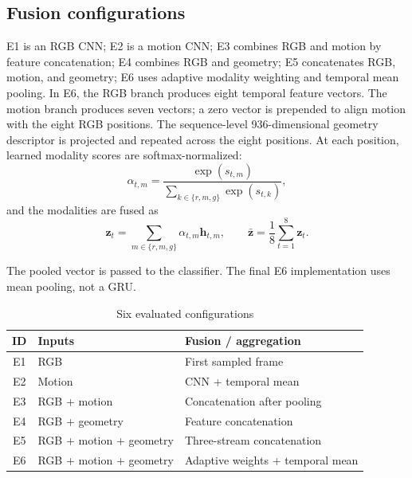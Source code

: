 \documentclass[a4paper,conference]{IEEEtran}
\begin{document}
\subsection{Fusion configurations}
E1 is an RGB CNN; E2 is a motion CNN; E3 combines RGB and motion by feature concatenation; E4 combines RGB and geometry; E5 concatenates RGB, motion, and geometry; E6 uses adaptive modality weighting and temporal mean pooling. In E6, the RGB branch produces eight temporal feature vectors. The motion branch produces seven vectors; a zero vector is prepended to align motion with the eight RGB positions. The sequence-level 936-dimensional geometry descriptor is projected and repeated across the eight positions. At each position, learned modality scores are softmax-normalized:
\begin{equation}
\alpha_{t,m}=\frac{\exp(s_{t,m})}{\sum_{k\in\{r,m,g\}}\exp(s_{t,k})},
\end{equation}
and the modalities are fused as
\begin{equation}
\mathbf{z}_t=\sum_{m\in\{r,m,g\}}\alpha_{t,m}\mathbf{h}_{t,m},
\qquad \bar{\mathbf{z}}=\frac{1}{8}\sum_{t=1}^{8}\mathbf{z}_t.
\end{equation}

The pooled vector is passed to the classifier. The final E6 implementation uses mean pooling, not a GRU.


\begin{table}[t]
\caption{Six evaluated configurations}\label{tab:configs}\centering\footnotesize
\begin{tabular}{cll}\toprule
ID & Inputs & Fusion / aggregation\\\midrule
E1 & RGB & First sampled frame\\
E2 & Motion & CNN + temporal mean\\
E3 & RGB + motion & Concatenation after pooling\\
E4 & RGB + geometry & Feature concatenation\\
E5 & RGB + motion + geometry & Three-stream concatenation\\
E6 & RGB + motion + geometry & Adaptive weights + temporal mean\\
\bottomrule\end{tabular}
\end{table}
\end{document}
